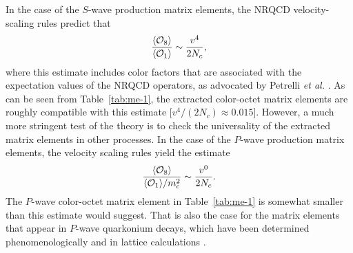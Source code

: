 In the case of the $S$-wave production matrix elements, the NRQCD
velocity-scaling rules predict that 
\begin{equation} 
{ \langle{\cal O}_8\rangle \over \langle{\cal O}_1\rangle}
\sim {v^4 \over 2N_c},
\end{equation} 
where this estimate includes color factors that are associated with
the expectation values of the NRQCD operators, as advocated by Petrelli
{\it et al.} \cite{Petrelli:1997ge}. As can be seen from
Table~\ref{tab:me-1}, the extracted color-octet matrix elements are
roughly compatible with this estimate [$v^4/(2N_c)\approx 0.015$].
However, a much more stringent test of the theory is to check the
universality of the extracted matrix elements in other processes. In
the case of the $P$-wave production matrix elements, the velocity
scaling rules yield the estimate
\begin{equation}
{\langle{\cal O}_8\rangle \over \langle{\cal O}_1\rangle/m_c^2}
\sim {v^0 \over 2N_c}.
\end{equation}
The $P$-wave color-octet matrix element in Table~\ref{tab:me-1} is
somewhat smaller than this estimate would suggest. That is also the
case for the matrix elements that appear in $P$-wave quarkonium
decays, which have been determined phenomenologically
\cite{Maltoni:2000km} and in lattice calculations
\cite{Bodwin:1993wf,Bodwin:1994js,Bodwin:1996tg,Bodwin:1996mf,Bodwin:2001mk}.


